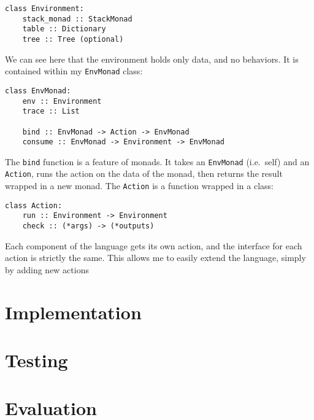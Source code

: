 \documentclass[11pt]{article}
\begin{document}
\begin{verbatim}
class Environment:
    stack_monad :: StackMonad
    table :: Dictionary
    tree :: Tree (optional)
\end{verbatim}

We can see here that the environment holds only data, and no behaviors.
It is contained within my \texttt{EnvMonad} class:

\begin{verbatim}
class EnvMonad:
    env :: Environment
    trace :: List
    
    bind :: EnvMonad -> Action -> EnvMonad
    consume :: EnvMonad -> Environment -> EnvMonad
\end{verbatim}

The \texttt{bind} function is a feature of monads. It takes an
\texttt{EnvMonad} (i.e.~self) and an \texttt{Action}, runs the action on
the data of the monad, then returns the result wrapped in a new monad.
The \texttt{Action} is a function wrapped in a class:

\begin{verbatim}
class Action:
    run :: Environment -> Environment
    check :: (*args) -> (*outputs)
\end{verbatim}

Each component of the language gets its own action, and the interface
for each action is strictly the same. This allows me to easily extend
the language, simply by adding new actions

\hypertarget{implementation}{%
\section{Implementation}\label{implementation}}

\hypertarget{testing}{%
\section{Testing}\label{testing}}

\hypertarget{evaluation}{%
\section{Evaluation}\label{evaluation}}
\end{document}
